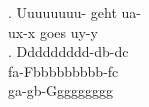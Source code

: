 \ex. \gll Uuuuuuuu- geht ua- \\
          ux-x goes uy-y \\

\GlossMorphAlignOff
\ex. \glll Ddddddddd-db-dc \\
           fa-Fbbbbbbbbb-fc \\
           ga-gb-Ggggggggg \\


